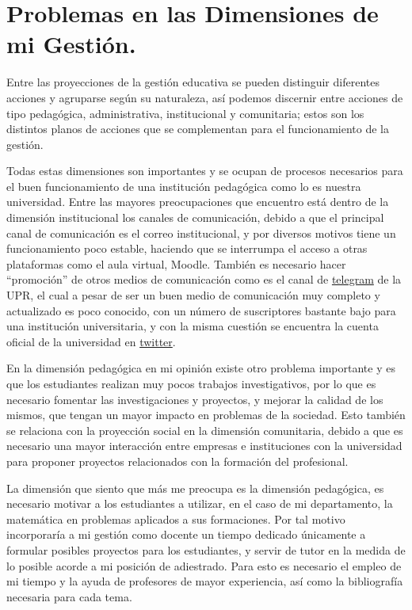 \documentclass{article}
\begin{document}
\section*{\color{uprgreen} Problemas en las Dimensiones de mi Gestión.}
\label{sec:PDG}
{\justifying\fontsize{13}{18}\large 
Entre las proyecciones de la gestión educativa se pueden distinguir diferentes acciones y agruparse según su naturaleza, así podemos discernir entre acciones de tipo pedagógica, administrativa, institucional y comunitaria; estos son los distintos planos de acciones que se complementan para el funcionamiento de la gestión. \hyperref[RUP]{\text{$[4]$}}

Todas estas dimensiones son importantes y se ocupan de procesos necesarios para el buen funcionamiento de una institución pedagógica como lo es nuestra universidad. Entre las mayores preocupaciones que encuentro está dentro de la dimensión institucional los canales de comunicación, debido a que el principal canal de comunicación es el correo institucional, y por diversos motivos tiene un funcionamiento poco estable, haciendo que se interrumpa el acceso a otras plataformas como el aula virtual, Moodle. También es necesario hacer ``promoción'' de otros medios de comunicación como es el canal de \href{https://t.me/CanalUprCuba}{telegram} de la UPR, el cual a pesar de ser un buen medio de comunicación muy completo y actualizado es poco conocido, con un número de suscriptores bastante bajo para una institución universitaria, y con la misma cuestión se encuentra la cuenta oficial de la universidad en \href{https://twitter.com/UPR_Cuba}{twitter}.

En la dimensión pedagógica en mi opinión existe otro problema importante y es que los estudiantes realizan muy pocos trabajos investigativos, por lo que es necesario fomentar las investigaciones y proyectos, y mejorar la calidad de los mismos, que tengan un mayor impacto en problemas de la sociedad. Esto también se relaciona con la proyección social en la dimensión comunitaria, debido a que es necesario una mayor interacción entre empresas e instituciones con la universidad para proponer proyectos relacionados con la formación del profesional.

La dimensión que siento que más me preocupa es la dimensión pedagógica, es necesario motivar a los estudiantes a utilizar, en el caso de mi departamento, la matemática en problemas aplicados a sus formaciones. Por tal motivo incorporaría a mi gestión como docente un tiempo dedicado únicamente a formular posibles proyectos para los estudiantes, y servir de tutor en la medida de lo posible acorde a mi posición de adiestrado. Para esto es necesario el empleo de mi tiempo y la ayuda de profesores de mayor experiencia, así como la bibliografía necesaria para cada tema.

}
\end{document}
